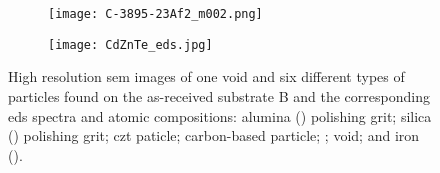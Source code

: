\begin{figure}[htbp]
\begin{subfigure}[t]{\textwidth}
\begin{minipage}[t]{0.11\linewidth}
          \end{minipage}
    \end{subfigure}%
    \par\bigskip
    \begin{subfigure}[t]{\textwidth}
        \caption{}\label{fig:SEM_B_particulates_eds}
          \begin{minipage}[t]{0.43\linewidth}
            \centering
            \texttt{[image: C-3895-23Af2\_m002.png]}
          \end{minipage}
          \hfill
          \begin{minipage}[t]{0.43\linewidth}
            \centering
            \texttt{[image: CdZnTe\_eds.jpg]}
          \end{minipage}
          \begin{minipage}[t]{0.11\linewidth}
            \centering
            \atomicTable[\ce{Cd}&\SI{52.61}{}][\ce{Te}&\SI{45.67}{}][\ce{Zn}&\SI{1.72}{}]
          \end{minipage}
    \end{subfigure}%
    \caption[\Ac{sem} images, \ac{eds} spectra, and \ac{eds} atomic compositions of one void and six different types of particles found on as-received substrate B.]{High resolution \ac{sem} images of one void and six different types of particles found on the as-received substrate B and the corresponding \ac{eds} spectra and atomic compositions:  alumina () polishing grit;  silica () polishing grit;  \ac{czt} paticle;  carbon-based particle;  ;  void; and  iron ().}\label{fig:subBa_sem_w_eds}
\end{figure}
%
